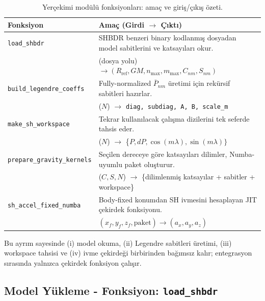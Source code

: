 \begin{table}[H]
\centering
\caption{Yerçekimi modülü fonksiyonları: amaç ve giriş/çıkış özeti.}
\label{tab:grav_api}
\renewcommand{\arraystretch}{1.45}
\setlength{\tabcolsep}{10pt}
\begin{tabular}{p{4.4cm} p{10.3cm}}
\hline
\textbf{Fonksiyon} & \textbf{Amaç (Girdi $\rightarrow$ Çıktı)}\\
\hline
\texttt{load\_shbdr} &
SHBDR benzeri binary kodlanmış dosyadan model sabitlerini ve katsayıları okur.\\
& \small (dosya yolu) $\rightarrow (R_\text{ref}, GM, n_\text{max}, m_\text{max}, C_{nm}, S_{nm})$\\[4pt]

\texttt{build\_legendre\_coeffs} &
Fully-normalized $\bar P_{nm}$ üretimi için rekürsif sabitleri hazırlar.\\
& \small ($N$) $\rightarrow$ \texttt{diag, subdiag, A, B, scale\_m}\\[4pt]

\texttt{make\_sh\_workspace} &
Tekrar kullanılacak çalışma dizilerini tek seferde tahsis eder.\\
& \small ($N$) $\rightarrow$ \{$P, dP, \cos(m\lambda), \sin(m\lambda)\}$\\[4pt]

\texttt{prepare\_gravity\_kernels} &
Seçilen dereceye göre katsayıları dilimler, Numba-uyumlu paket oluşturur.\\
& \small ($C,S,N$) $\rightarrow$ \{dilimlenmiş katsayılar + sabitler + workspace\}\\[4pt]

\texttt{sh\_accel\_fixed\_numba} &
Body-fixed konumdan SH ivmesini hesaplayan JIT çekirdek fonksiyonu.\\
& \small $(x_f,y_f,z_f,\text{paket}) \rightarrow (a_x,a_y,a_z)$\\
\hline
\end{tabular}
\end{table}

Bu ayrım sayesinde (i) model okuma, (ii) Legendre sabitleri üretimi,
(iii) workspace tahsisi ve (iv) ivme çekirdeği birbirinden bağımsız kalır;
entegrasyon sırasında yalnızca çekirdek fonksiyon çalışır.


\subsection*{Model Yükleme - Fonksiyon: \texttt{load\_shbdr}}
\label{subsec:load_shbdr}

